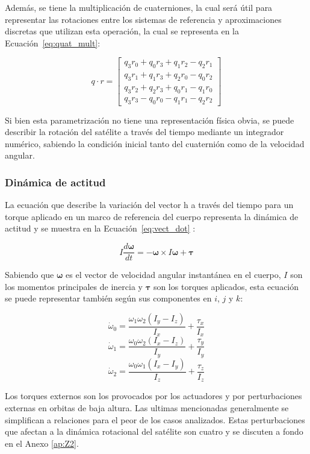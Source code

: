 Además, se tiene la multiplicación de cuaterniones, la cual será útil para representar las rotaciones entre los sistemas de referencia y aproximaciones discretas que utilizan esta operación, la cual se representa en la Ecuación~\ref{eq:quat_mult}:

\begin{equation}
	q \cdot r =
	\begin{bmatrix}
		q_3 r_0 + q_0 r_3 + q_1 r_2 - q_2 r_1 \\
		q_3 r_1 + q_1 r_3 + q_2 r_0 - q_0 r_2 \\
		q_3 r_2 + q_2 r_3 + q_0 r_1 - q_1 r_0 \\
		q_3 r_3 - q_0 r_0 - q_1 r_1 - q_2 r_2
	\end{bmatrix}
	\label{eq:quat_mult}
\end{equation}

Si bien esta parametrización no tiene una representación física obvia, se puede describir la rotación del satélite a través del tiempo mediante un integrador numérico, sabiendo la condición inicial tanto del cuaternión como de la velocidad angular.

\subsubsection{Dinámica de actitud}

La ecuación que describe la variación del vector \gls{h} a través del tiempo para un torque aplicado en un marco de referencia del cuerpo representa la dinámica de actitud y se muestra en la Ecuación~\ref{eq:vect_dot} \cite{ref22}:

\begin{equation}
	I \frac{d\boldsymbol{\omega}}{dt} = - \boldsymbol{\omega} \times I \boldsymbol{\omega} + \boldsymbol{\tau}
	\label{eq:vect_dot}
\end{equation}

Sabiendo que \( \boldsymbol{\omega} \) es el vector de velocidad angular instantánea en el cuerpo, \( I \) son los momentos principales de inercia y \( \boldsymbol{\tau} \) son los torques aplicados, esta ecuación se puede representar también según sus componentes en \( i \), \( j \) y \( k \):

\[
\dot{\omega}_0 = \frac{\omega_1 \omega_2 (I_y - I_z)}{I_x} + \frac{\tau_x}{I_x}
\]
\[
\dot{\omega}_1 = \frac{\omega_0 \omega_2 (I_x - I_z)}{I_y} + \frac{\tau_y}{I_y}
\]
\[
\dot{\omega}_2 = \frac{\omega_0 \omega_1 (I_x - I_y)}{I_z} + \frac{\tau_z}{I_z}
\]

Los torques externos son los provocados por los actuadores y por perturbaciones externas en orbitas de baja altura. Las ultimas mencionadas generalmente se simplifican a relaciones para el peor de los casos analizados. Estas perturbaciones que afectan a la dinámica rotacional del satélite son cuatro y se discuten a fondo en el Anexo \ref{ap:Z2}.


